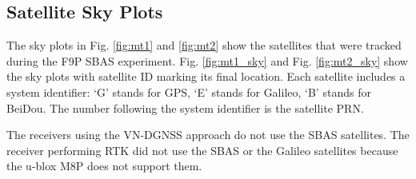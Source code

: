 \documentclass[letterpaper, 10 pt,onecolumn]{article}
\begin{document}
	
	
	
	
	\subsection{Satellite Sky Plots}
	
	The sky plots in Fig. \ref{fig:mt1} and \ref{fig:mt2} show the satellites that were tracked during the F9P SBAS experiment. 
	Fig. \ref{fig:mt1_sky} and Fig. \ref{fig:mt2_sky} show the sky plots with satellite ID marking its final location. 
	Each satellite includes a system  identifier: 
	`G' stands for GPS, 
	`E' stands for Galileo, 
	`B' stands for BeiDou.  
	The number following the system identifier is the satellite PRN. 
	 
	The receivers using the VN-DGNSS approach do not use the SBAS satellites. 
	The receiver performing RTK did not use the SBAS or the Galileo satellites because the u-blox M8P does not support them.
	\black
	
\end{document}
